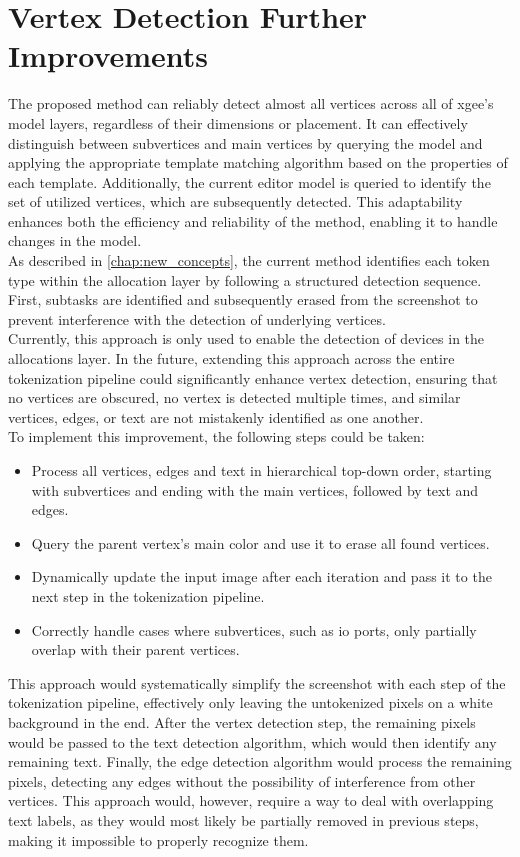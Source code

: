 \section{Vertex Detection Further Improvements}
\label{sec:vertex_detection_further_improvements}
The proposed method can reliably detect almost all vertices across all of \acrshort{xgee}'s model layers, regardless of their dimensions or placement. It can effectively distinguish between subvertices and main vertices by querying the model and applying the appropriate template matching algorithm based on the properties of each template. Additionally, the current editor model is queried to identify the set of utilized vertices, which are subsequently detected. This adaptability enhances both the efficiency and reliability of the method, enabling it to handle changes in the model.\\
As described in \autoref{chap:new_concepts}, the current method identifies each token type within the allocation layer by following a structured detection sequence. First, subtasks are identified and subsequently erased from the screenshot to prevent interference with the detection of underlying vertices.\\
Currently, this approach is only used to enable the detection of devices in the allocations layer. In the future, extending this approach across the entire tokenization pipeline could significantly enhance vertex detection, ensuring that no vertices are obscured, no vertex is detected multiple times, and similar vertices, edges, or text are not mistakenly identified as one another.\\
To implement this improvement, the following steps could be taken:

\begin{itemize}
    \item Process all vertices, edges and text in hierarchical top-down order, starting with subvertices and ending with the main vertices, followed by text and edges.
    \item Query the parent vertex's main color and use it to erase all found vertices.
    \item Dynamically update the input image after each iteration and pass it to the next step in the tokenization pipeline.
    \item Correctly handle cases where subvertices, such as \acrshort{io} ports, only partially overlap with their parent vertices.
\end{itemize}

This approach would systematically simplify the screenshot with each step of the tokenization pipeline, effectively only leaving the untokenized pixels on a white background in the end. After the vertex detection step, the remaining pixels would be passed to the text detection algorithm, which would then identify any remaining text. Finally, the edge detection algorithm would process the remaining pixels, detecting any edges without the possibility of interference from other vertices. This approach would, however, require a way to deal with overlapping text labels, as they would most likely be partially removed in previous steps, making it impossible to properly recognize them.\\

